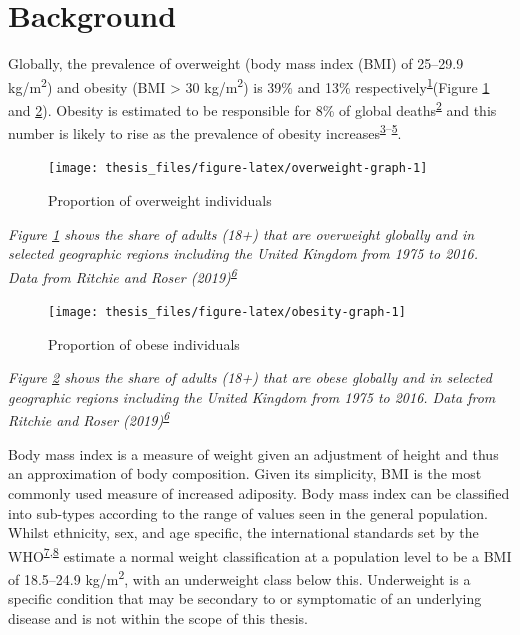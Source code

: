 \documentclass[11pt,twoside]{bristolthesis}
\newcommand{\bsmall}{\begin{small}}
\newcommand{\esmall}{\end{small}}
\begin{document}
\newpage

\hypertarget{background}{%
\section{Background}\label{background}}

Globally, the prevalence of overweight (body mass index (BMI) of 25--29.9 kg/m\textsuperscript{2}) and obesity (BMI \textgreater{} 30 kg/m\textsuperscript{2}) is 39\% and 13\% respectively\textsuperscript{\protect\hyperlink{ref-WorldHealthOrganisation2018}{1}}(Figure \ref{fig:overweight-graph} and \ref{fig:obesity-graph}). Obesity is estimated to be responsible for 8\% of global deaths\textsuperscript{\protect\hyperlink{ref-Stanaway2018}{2}} and this number is likely to rise as the prevalence of obesity increases\textsuperscript{\protect\hyperlink{ref-Ng2014}{3}--\protect\hyperlink{ref-Abarca-Gomez2017}{5}}.

\par
\begin{figure}
\texttt{[image: thesis\_files/figure-latex/overweight-graph-1]} \caption{Proportion of overweight individuals}\label{fig:overweight-graph}
\end{figure}
\noindent
\bsmall
\emph{Figure \ref{fig:overweight-graph} shows the share of adults (18+) that are overweight globally and in selected geographic regions including the United Kingdom from 1975 to 2016. Data from Ritchie and Roser (2019)\textsuperscript{\protect\hyperlink{ref-Ritchie2019}{6}}}
\esmall
\begin{figure}
\texttt{[image: thesis\_files/figure-latex/obesity-graph-1]} \caption{Proportion of obese individuals}\label{fig:obesity-graph}
\end{figure}
\noindent
\bsmall
\emph{Figure \ref{fig:obesity-graph} shows the share of adults (18+) that are obese globally and in selected geographic regions including the United Kingdom from 1975 to 2016. Data from Ritchie and Roser (2019)\textsuperscript{\protect\hyperlink{ref-Ritchie2019}{6}}}
\esmall

Body mass index is a measure of weight given an adjustment of height and thus an approximation of body composition. Given its simplicity, BMI is the most commonly used measure of increased adiposity. Body mass index can be classified into sub-types according to the range of values seen in the general population. Whilst ethnicity, sex, and age specific, the international standards set by the WHO\textsuperscript{\protect\hyperlink{ref-WHO1995}{7},\protect\hyperlink{ref-WHO2000}{8}} estimate a normal weight classification at a population level to be a BMI of 18.5--24.9 kg/m\textsuperscript{2}, with an underweight class below this. Underweight is a specific condition that may be secondary to or symptomatic of an underlying disease and is not within the scope of this thesis.
\end{document}
